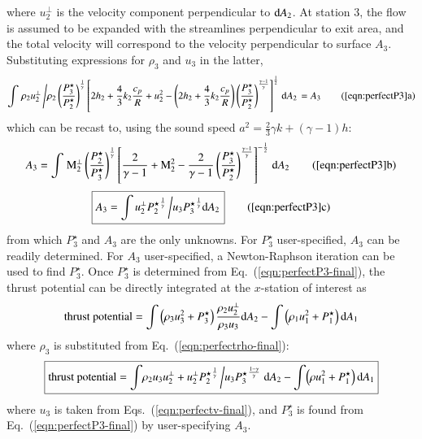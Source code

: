 \documentclass{warpdoc}
\numberwithin{equation}{section}
\newcommand{\Cp}{{c_{p}}}
\newcommand{\mfd}{\displaystyle}
\newcommand{\ordi}{{\rm d}}
\newcommand\frameeqn[1]{\fbox{$#1$}}
\begin{document}
%
where $u_2^\perp$ is the velocity component perpendicular to $\ordi A_2$.
At station $3$, the flow is assumed to be expanded with the streamlines
perpendicular to exit area, and the total velocity will correspond to
the velocity perpendicular to surface $A_3$.
Substituting expressions for $\rho_3$ and $u_3$ in the latter,
%
\begin{equation}
  \int \left. {\rho_2 u_2^\perp} \left/ \rho_2 \left( \mfd \frac{P_3^\star}{P_2^\star} \right)^\frac{1}{\gamma} 
  \left[ 2 h_2+\frac{4}{3}k_2 \frac{\Cp}{R}+u_2^2
   -\left( 2 h_2 +\frac{4}{3}k_2 \frac{\Cp}{R} \right)
      \left(\frac{P_3^\star}{P_2^\star}\right)^\frac{\gamma-1}{\gamma}
  \right]^\frac{1}{2}            
   \right. \ordi A_2 \right.= A_3
  \tag{\ref{eqn:perfectP3}a}
\end{equation} 
%
which can be recast to, using the sound speed $a^2=\frac{2}{3}\gamma k +(\gamma-1) h$:
%
\begin{equation}
  A_3=\mfd \int \left. {\rm M}_2^\perp  \left( \mfd \frac{P_2^\star}{P_3^\star} \right)^\frac{1}{\gamma}
  \left[ \frac{2}{\gamma-1}+{\rm M}_2^2
   - \frac{2}{\gamma-1}
      \left(\frac{P_3^\star}{P_2^\star}\right)^\frac{\gamma-1}{\gamma}
  \right]^{-\frac{1}{2}}
   \right. \ordi A_2
  \tag{\ref{eqn:perfectP3}b}
  \label{eqn:perfectP3-2}
\end{equation}
%
%
\begin{equation}
 \frameeqn{
  A_3=\mfd\int u_2^\perp   {P_2^\star}^\frac{1}{\gamma}
  \left/
  u_3 {P_3^\star}^\frac{1}{\gamma}
  \ordi A_2
   \right.
  }
  \tag{\ref{eqn:perfectP3}c}
  \label{eqn:perfectP3-final}
\end{equation}
%
from which $P_3^\star$ and $A_3$ are the only unknowns. For $P_3^\star$ user-specified,
$A_3$ can be readily determined. For $A_3$ user-specified, a Newton-Raphson
iteration can be used to find $P_3^\star$. Once $P_3^\star$ is determined from
Eq.~(\ref{eqn:perfectP3-final}), the thrust potential
can be directly integrated at the $x$-station of interest as
%
\begin{equation}
 {\rm thrust~potential} = \mfd\int \left(\rho_3 u_3^2 + P_3^\star \right)
     \frac{\rho_2 u_2^\perp}{\rho_3 u_3} \ordi A_2
   - \mfd\int \left(\rho_1 u_1^2 + P_1^\star \right) \ordi A_1
\end{equation}
%
where $\rho_3$  is substituted from  Eq.~(\ref{eqn:perfectrho-final}):
%
\begin{equation}
 \frameeqn{
  {\rm thrust~potential}=  \mfd\int \!\rho_2 u_{3} u_2^\perp
 + u_2^\perp {P^\star_2}^{\frac{1}{\gamma}}  \left/ u_{3}{P_3^\star}^{\frac{1-\gamma}{\gamma}}
    \right.\ordi A_2
   - \mfd\int \!\left(\rho u_1^2 + P_1^\star \right) \ordi A_1
 }
\end{equation}
%
where $u_3$  is taken from Eqs.~(\ref{eqn:perfectv-final}), and
$P_3^\star$ is found from Eq.~(\ref{eqn:perfectP3-final}) by user-specifying $A_3$.
\end{document}
